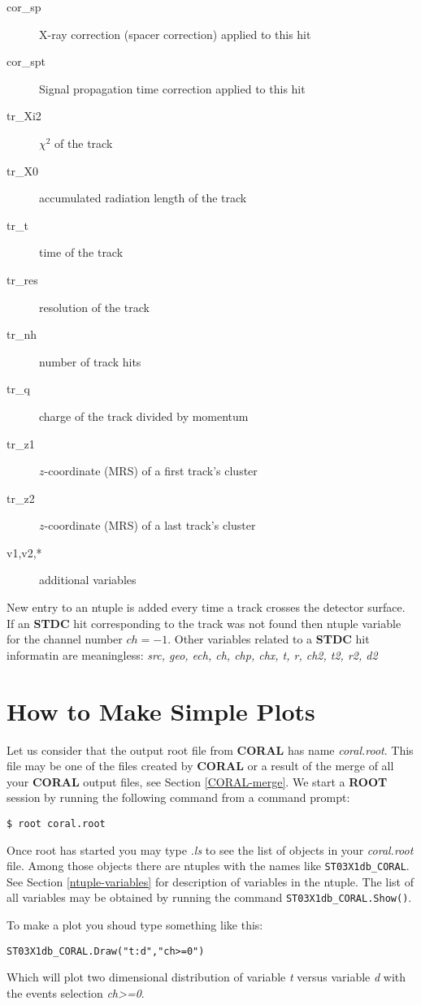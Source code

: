 \documentclass[a4paper,12pt]{article}
\begin{document}
\begin{appendix}
\begin{description}
\item[cor\_sp]   X-ray correction (spacer correction) applied to this hit
\item[cor\_spt]  Signal propagation time correction applied to this hit
\item[tr\_Xi2] $\chi^2$ of the track
\item[tr\_X0]  accumulated radiation length of the track
\item[tr\_t]   time of the track
\item[tr\_res] resolution of the track
\item[tr\_nh]  number of track hits
\item[tr\_q]   charge of the track divided by momentum
\item[tr\_z1]  $z$-coordinate (MRS) of a first track's cluster
\item[tr\_z2]  $z$-coordinate (MRS) of a last track's cluster
\item[v1,v2,*] additional variables
\end{description}

New entry to an ntuple is added every time a track crosses the detector surface.
If an {\bf STDC} hit corresponding to the track was not found then ntuple variable for
the channel number $ch=-1$. Other variables related to a {\bf STDC} hit informatin are
meaningless: {\it src, geo, ech, ch, chp, chx, t, r, ch2, t2, r2, d2}


\section{How to Make Simple Plots}
Let us consider that the output root file from {\bf CORAL} has name {\it coral.root}.
This file may be one of the files created by {\bf CORAL} or a result of the merge of all
your {\bf CORAL} output files, see Section \ref{CORAL-merge}. We start a {\bf ROOT} session
by running the following command from a command prompt:
\begin{verbatim}
$ root coral.root
\end{verbatim}
Once root has started you may type {\it .ls} to see the list of objects in your
{\it coral.root} file. Among those objects there are ntuples with the names like
{\tt ST03X1db\_CORAL}. See Section \ref{ntuple-variables} for description of
variables in the ntuple. The list of all variables may be obtained by running the command
{\tt ST03X1db\_CORAL.Show()}.


To make a plot you shoud type something like this:
\begin{verbatim}
ST03X1db_CORAL.Draw("t:d","ch>=0")
\end{verbatim}
Which will plot two dimensional distribution of variable {\it t} versus variable {\it d}
with the events selection {\it ch>=0}.


\end{appendix}
\end{document}

